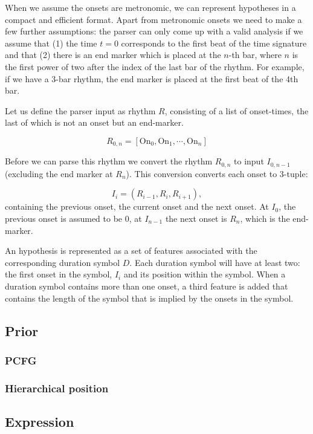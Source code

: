 When we assume the onsets are metronomic, we can represent hypotheses in a compact and efficient format. Apart from metronomic onsets we need to make a few further assumptions: the parser can only come up with a valid analysis if we assume that (1) the time $t=0$ corresponds to the first beat of the time signature and that (2) there is an end marker which is placed at the $n$-th bar, where $n$ is the first power of two after the index of the last bar of the rhythm. For example, if we have a 3-bar rhythm, the end marker is placed at the first beat of the 4th bar.

Let us define the parser input as rhythm $R$, consisting of a list of onset-times, the last of which is not an onset but an end-marker. 

\begin{equation}
R_{0,n} = [\textrm{On}_0, \textrm{On}_{1}, \cdots, \textrm{On}_n]
\end{equation}

Before we can parse this rhythm we convert the rhythm $R_{0,n}$ to input $I_{0,n-1}$ (excluding the end marker at $R_n$). This conversion converts each onset to 3-tuple:

\begin{equation}
I_i = (R_{i-1}, R_i, R_{i+1}),
\end{equation}
containing the previous onset, the current onset and the next onset. At $I_0$, the previous onset is assumed to be $0$, at $I_{n-1}$ the next onset is $R_n$, which is the end-marker. 

An hypothesis is represented as a set of features associated with the corresponding duration symbol $D$. Each duration symbol will have at least two: the first onset in the symbol, $I_i$ and its position within the symbol. When a duration symbol contains more than one onset, a third feature is added that contains the length of the symbol that is implied by the onsets in the symbol.

\subsection{Prior}
\subsubsection*{PCFG}
\subsubsection*{Hierarchical position}
\subsection{Expression}




